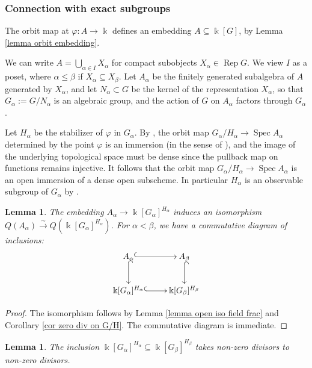 \documentclass[11pt]{amsart}
\def\bk{\Bbbk}
\def\Rep{\operatorname{Rep}}
\def\Spec{\operatorname{Spec}}
\def\sub{\subseteq}
\def\xto{\xrightarrow}
\newtheorem{lemma}[thm]{Lemma}
\theoremstyle{definition}
\theoremstyle{remark}
\numberwithin{equation}{section}
\begin{document}
	\subsubsection{Connection with exact subgroups}\label{452} The orbit map at $\varphi:A\to\bk$ defines an embedding $A\sub \Bbbk[G]$, by Lemma \ref{lemma orbit embedding}.   
    
    We can write $A=\bigcup\limits_{\alpha\in I} X_\alpha$ for compact subobjects $X_\alpha\in \Rep G$.  We view $I$ as a poset, where $\alpha\le\beta$	if $X_\alpha\sub X_{\beta}$.   Let $A_\alpha$ be the finitely generated subalgebra of $A$ generated by $X_\alpha$, and let $N_\alpha\subset G$ be the kernel of the representation $X_\alpha$, so that $G_\alpha:=G/N_\alpha$ is an algebraic group, and the action of $G$ on $A_\alpha$ factors through $G_\alpha$. 
	  
	Let $H_{\alpha}$ be the stabilizer of $\varphi$ in $G_{\alpha}$.  By \cite[Cor.~7.8]{CS}, the orbit map $G_{\alpha}/H_{\alpha}\to \Spec A_{\alpha}$ determined by the point $\varphi$ is an immersion (in the sense of \cite[Defn.~5.3.5]{C2}), and the image of the underlying topological space must be dense since the pullback map on functions remains injective.  It follows that the orbit map $G_{\alpha}/H_{\alpha}\to\Spec A_{\alpha}$ is an open immersion of a dense open subscheme. In particular $H_\alpha$ is an observable subgroup of $G_\alpha$ by \cite[Theorem~7.3.1]{C1}.

\begin{lemma}\label{lem:Aab}
    The embedding $A_{\alpha}\to\Bbbk[G_{\alpha}]^{H_{\alpha}}$ induces an isomorphism $Q(A_{\alpha})\xto{\sim}Q(\Bbbk[G_{\alpha}]^{H_{\alpha}})$.  For $\alpha<\beta$, we have a commutative diagram of inclusions:
	\[
	\xymatrix{
		A_{\alpha} \ar@{^{(}->}[r]\ar@{^{(}->}[d] & A_{\beta} \ar@{^{(}->}[d] \\ \Bbbk[G_{\alpha}]^{H_{\alpha}} \ar@{^{(}->}[r] & \Bbbk[G_{\beta}]^{H_{\beta}}
	}
	\]
\end{lemma}
\begin{proof}
    The isomorphism follows by Lemma  \ref{lemma open iso field frac} and Corollary \ref{cor zero div on G/H}. The commutative diagram is immediate.
\end{proof}
    
	
	\begin{lemma}\label{lemma below diagram}
		The inclusion $\Bbbk[G_{\alpha}]^{H_{\alpha}}\sub \Bbbk[G_{\beta}]^{H_{\beta}}$ takes non-zero divisors to non-zero divisors.
	\end{lemma}
	
\end{document}
